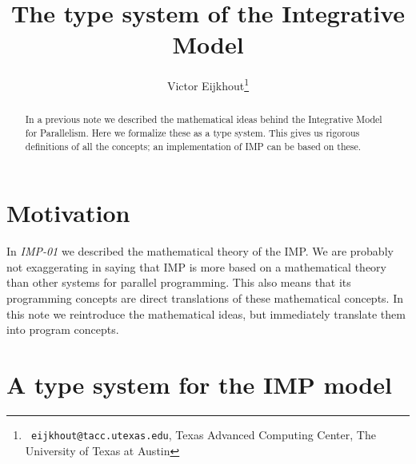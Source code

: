 \documentclass[11pt,fleqn,preprint]{impreport}
\title[IMP type system]{The type system of the Integrative Model}
\author[Eijkhout]{Victor Eijkhout\thanks{{\tt
      eijkhout@tacc.utexas.edu}, Texas Advanced Computing Center, The
    University of Texas at Austin}}
\begin{document}
\maketitle

\begin{abstract}
In a previous note we described the mathematical ideas behind 
the Integrative Model for Parallelism.
Here we formalize these as a type system.
This gives us rigorous definitions of all the concepts;
an implementation of IMP can be based on these.
\end{abstract}

\section{Motivation}

In \emph{IMP-01} we described the mathematical theory of the \acf{IMP}.
We are probably not exaggerating in saying that \ac{IMP} is more
based on a mathematical theory
than other systems for parallel programming. 
This also means that its programming concepts are direct translations
of these mathematical concepts. In this note we 
reintroduce the mathematical ideas, but immediately translate them 
into program concepts.

\section{A type system for the IMP model}
\label{sec:formal}


%
%
\end{document}

